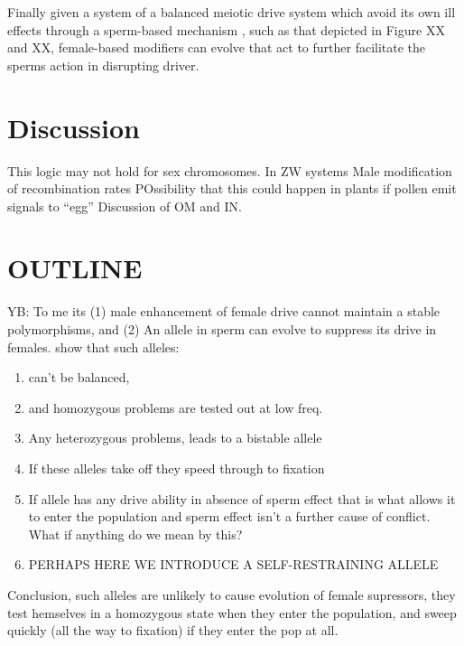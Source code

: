 \documentclass[12pt,letterpaper]{article}
\newcommand{\yb}[1]{{ \color{blue} #1}}
\begin{document}
Finally given a system of a balanced meiotic drive system which avoid
its own ill effects through a sperm-based mechanism
, such as that depicted in Figure XX and XX, female-based modifiers 
can evolve that act to further facilitate the sperms action in
disrupting driver.

\section*{Discussion}


This logic may not hold for sex chromosomes. In ZW systems 
 Male modification of recombination rates
POssibility that this could happen in plants if pollen emit signals to ``egg''
Discussion of OM and IN.


\section*{OUTLINE}
\yb{YB: To me its (1) male enhancement of female drive cannot maintain a stable polymorphisms, and (2) An allele in sperm can evolve to suppress its drive in females.}
show that such alleles:
\begin{enumerate}
\item can't be balanced, \\
\item and homozygous problems are tested out at low freq.  \\
\item Any heterozygous problems, leads to a bistable allele\\
\item If these alleles take off they speed through to fixation\\
\item If allele has any drive ability in absence of sperm effect that is what allows it to enter the population
and sperm effect isn't a further cause of conflict. What if anything do we mean by this?\\
\item PERHAPS HERE WE INTRODUCE A SELF-RESTRAINING ALLELE
\end{enumerate}

Conclusion, such alleles are unlikely to cause evolution of female supressors, they test hemselves in a homozygous
state when they enter the population, and sweep quickly (all the way to fixation) if they enter the pop at all.\\
\end{document}

